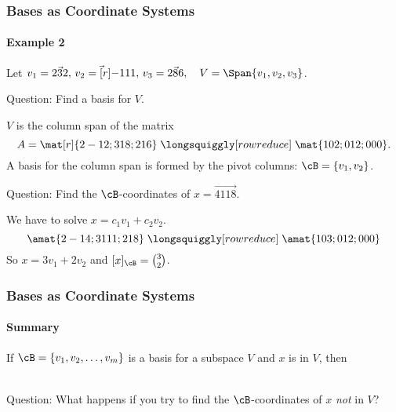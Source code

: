 
\begin{frame}
\frametitle{Bases as Coordinate Systems}
\framesubtitle{Example 2}

Let $v_1 = \vec{2 3 2},\,v_2=\vec[r]{-1 1 1},\,v_3=\vec{2 8 6},\quad
V = \Span\{v_1,v_2,v_3\}$.

\pause\medskip
\alert{Question:} Find a basis for $V$.\\
\begin{webonly}
$V$ is the column span of the matrix 
\abovedisplayskip=3pt\belowdisplayskip=3pt
\[ A = \mat[r]{2 -1 2; 3 1 8; 2 1 6}
\;\longsquiggly[row reduce]\;
\mat{1 0 2; 0 1 2; 0 0 0}. \]
A basis for the column span is
formed by the pivot columns: $\cB = \{v_1,v_2\}$.
\end{webonly}

\pause\medskip
\alert{Question:} Find the $\cB$-coordinates of $x = \vec{4 11 8}$.\\
\begin{webonly}
We have to solve $x = c_1v_1 + c_2v_2$.
\[  \amat{2 -1 4; 3 1 11; 2 1 8}
  \;\longsquiggly[row reduce]\;
  \amat{1 0 3; 0 1 2; 0 0 0}
\]
So $x = 3v_1 + 2v_2$ and $[x]_\cB = {3\choose 2}$.
\end{webonly}

\end{frame}



\begin{frame}
\frametitle{Bases as Coordinate Systems}
\framesubtitle{Summary}

\vskip-7mm\null
\begin{bluebox}{.9\linewidth}
  If $\cB = \{v_1,v_2,\ldots,v_m\}$ is a basis for a subspace $V$ and $x$ is in
  $V$, then\\[\abovedisplayskip]
  \null\hfill{}\hfill\null\\[\belowdisplayskip]
  \displayskips{3pt}%
\end{bluebox}

\pause[4]
\alert{Question:} What happens if you try to find the $\cB$-coordinates of $x$
\emph{not} in $V$?\\

\end{frame}


